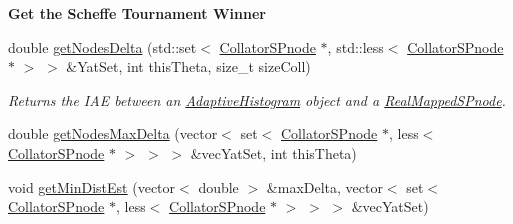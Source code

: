 \begin{Indent}{\bf \-Get the \-Scheffe \-Tournament \-Winner}
\begin{DoxyCompactItemize}
\item 
double \hyperlink{classsubpavings_1_1AdaptiveHistogramCollator_a79cc72c5021db50aa53b13f12f8fd234}{get\-Nodes\-Delta} (std\-::set$<$ \hyperlink{classsubpavings_1_1CollatorSPnode}{\-Collator\-S\-Pnode} $\ast$, std\-::less$<$ \hyperlink{classsubpavings_1_1CollatorSPnode}{\-Collator\-S\-Pnode} $\ast$ $>$ $>$ \&\-Yat\-Set, int this\-Theta, size\-\_\-t size\-Coll)
\begin{DoxyCompactList}\small\item\em \-Returns the \-I\-A\-E between an \hyperlink{classsubpavings_1_1AdaptiveHistogram}{\-Adaptive\-Histogram} object and a \hyperlink{classsubpavings_1_1RealMappedSPnode}{\-Real\-Mapped\-S\-Pnode}. \end{DoxyCompactList}\item 
double \hyperlink{classsubpavings_1_1AdaptiveHistogramCollator_a9ad5434670b0c8d57c7c3b9a7b9d006e}{get\-Nodes\-Max\-Delta} (vector$<$ set$<$ \hyperlink{classsubpavings_1_1CollatorSPnode}{\-Collator\-S\-Pnode} $\ast$, less$<$ \hyperlink{classsubpavings_1_1CollatorSPnode}{\-Collator\-S\-Pnode} $\ast$ $>$ $>$ $>$ \&vec\-Yat\-Set, int this\-Theta)
\item 
void \hyperlink{classsubpavings_1_1AdaptiveHistogramCollator_af45e40508aa9d729f5923787c3717a40}{get\-Min\-Dist\-Est} (vector$<$ double $>$ \&max\-Delta, vector$<$ set$<$ \hyperlink{classsubpavings_1_1CollatorSPnode}{\-Collator\-S\-Pnode} $\ast$, less$<$ \hyperlink{classsubpavings_1_1CollatorSPnode}{\-Collator\-S\-Pnode} $\ast$ $>$ $>$ $>$ \&vec\-Yat\-Set)
\end{DoxyCompactItemize}
\end{Indent}
